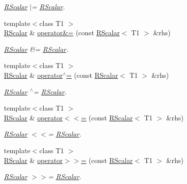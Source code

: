 \begin{DoxyCompactItemize}
\begin{DoxyCompactList}\small\item\em \mbox{\hyperlink{classENSEM_1_1RScalar}{R\+Scalar}} $\vert$= \mbox{\hyperlink{classENSEM_1_1RScalar}{R\+Scalar}}. \end{DoxyCompactList}\item 
{\footnotesize template$<$class T1 $>$ }\\\mbox{\hyperlink{classENSEM_1_1RScalar}{R\+Scalar}} \& \mbox{\hyperlink{classENSEM_1_1RScalar_aa091ededdea0fc13deb359321f213780}{operator\&=}} (const \mbox{\hyperlink{classENSEM_1_1RScalar}{R\+Scalar}}$<$ T1 $>$ \&rhs)
\begin{DoxyCompactList}\small\item\em \mbox{\hyperlink{classENSEM_1_1RScalar}{R\+Scalar}} \&= \mbox{\hyperlink{classENSEM_1_1RScalar}{R\+Scalar}}. \end{DoxyCompactList}\item 
{\footnotesize template$<$class T1 $>$ }\\\mbox{\hyperlink{classENSEM_1_1RScalar}{R\+Scalar}} \& \mbox{\hyperlink{classENSEM_1_1RScalar_ad69bdf7cec58f8ef8a8a42b250d97b25}{operator$^\wedge$=}} (const \mbox{\hyperlink{classENSEM_1_1RScalar}{R\+Scalar}}$<$ T1 $>$ \&rhs)
\begin{DoxyCompactList}\small\item\em \mbox{\hyperlink{classENSEM_1_1RScalar}{R\+Scalar}} $^\wedge$= \mbox{\hyperlink{classENSEM_1_1RScalar}{R\+Scalar}}. \end{DoxyCompactList}\item 
{\footnotesize template$<$class T1 $>$ }\\\mbox{\hyperlink{classENSEM_1_1RScalar}{R\+Scalar}} \& \mbox{\hyperlink{classENSEM_1_1RScalar_a4f12bedac2ac4848354e3c3018f6c9aa}{operator$<$$<$=}} (const \mbox{\hyperlink{classENSEM_1_1RScalar}{R\+Scalar}}$<$ T1 $>$ \&rhs)
\begin{DoxyCompactList}\small\item\em \mbox{\hyperlink{classENSEM_1_1RScalar}{R\+Scalar}} $<$$<$= \mbox{\hyperlink{classENSEM_1_1RScalar}{R\+Scalar}}. \end{DoxyCompactList}\item 
{\footnotesize template$<$class T1 $>$ }\\\mbox{\hyperlink{classENSEM_1_1RScalar}{R\+Scalar}} \& \mbox{\hyperlink{classENSEM_1_1RScalar_a35379cd7317c2c533aa26e3c15a9b03f}{operator$>$$>$=}} (const \mbox{\hyperlink{classENSEM_1_1RScalar}{R\+Scalar}}$<$ T1 $>$ \&rhs)
\begin{DoxyCompactList}\small\item\em \mbox{\hyperlink{classENSEM_1_1RScalar}{R\+Scalar}} $>$$>$= \mbox{\hyperlink{classENSEM_1_1RScalar}{R\+Scalar}}. \end{DoxyCompactList}\item 

\end{DoxyCompactItemize}
